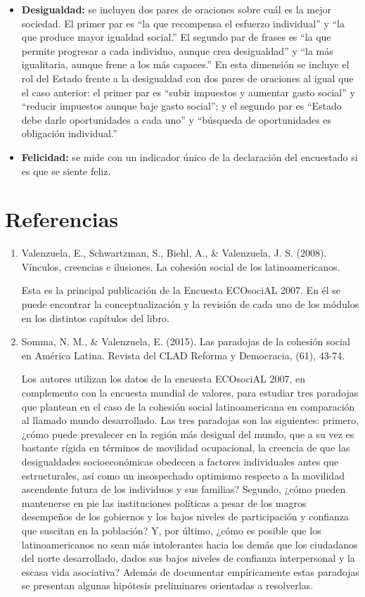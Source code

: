 \documentclass[
  12pt,
]{book}
\begin{document}
\begin{itemize}
\item
  \textbf{Desigualdad:} se incluyen dos pares de oraciones sobre cuál es la mejor sociedad. El primer par es ``la que recompensa el esfuerzo individual'' y ``la que produce mayor igualdad social.'' El segundo par de frases es ``la que permite progresar a cada individuo, aunque crea desigualdad'' y ``la más igualitaria, aunque frene a los más capaces.'' En esta dimensión se incluye el rol del Estado frente a la desigualdad con dos pares de oraciones al igual que el caso anterior: el primer par es ``subir impuestos y aumentar gasto social'' y ``reducir impuestos aunque baje gasto social''; y el segundo par es ``Estado debe darle oportunidades a cada uno'' y ``búsqueda de oportunidades es obligación individual.''
\item
  \textbf{Felicidad:} se mide con un indicador único de la declaración del encuestado si es que se siente feliz.
\end{itemize}

\hypertarget{referencias-4}{%
\section{Referencias}\label{referencias-4}}

\begin{enumerate}
\def\labelenumi{\arabic{enumi}.}
\item
  Valenzuela, E., Schwartzman, S., Biehl, A., \& Valenzuela, J. S. (2008). Vínculos, creencias e ilusiones. La cohesión social de los latinoamericanos.

  Esta es la principal publicación de la Encuesta ECOsociAL 2007. En él se puede encontrar la conceptualización y la revisión de cada uno de los módulos en los distintos capítulos del libro.\\
\item
  Somma, N. M., \& Valenzuela, E. (2015). Las paradojas de la cohesión social en América Latina. Revista del CLAD Reforma y Democracia, (61), 43-74.

  Los autores utilizan los datos de la encuesta ECOsociAL 2007, en complemento con la encuesta mundial de valores, para estudiar tres paradojas que plantean en el caso de la cohesión social latinoamericana en comparación al llamado mundo desarrollado. Las tres paradojas son las siguientes: primero, ¿cómo puede prevalecer en la región más desigual del mundo, que a su vez es bastante rígida en términos de movilidad ocupacional, la creencia de que las desigualdades socioeconómicas obedecen a factores individuales antes que estructurales, así como un insospechado optimismo respecto a la movilidad ascendente futura de los individuos y sus familias? Segundo, ¿cómo pueden mantenerse en pie las instituciones políticas a pesar de los magros desempeños de los gobiernos y los bajos niveles de participación y confianza que suscitan en la población? Y, por último, ¿cómo es posible que los latinoamericanos no sean más intolerantes hacia los demás que los ciudadanos del norte desarrollado, dados sus bajos niveles de confianza interpersonal y la escasa vida asociativa? Además de documentar empíricamente estas paradojas se presentan algunas hipótesis preliminares orientadas a resolverlas.
\end{enumerate}
\end{document}
